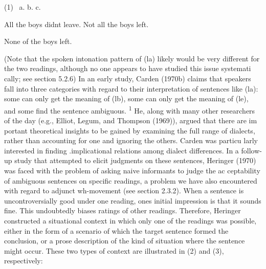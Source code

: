 \begin{multicols}{2}
\begin{styleStandard}
(1) \ a. b. c.
\end{styleStandard}


\begin{styleTextbody}
All the boys didn{\textquotesingle}t leave. Not all the boys left.
\end{styleTextbody}


\begin{styleTextbody}
None of the boys left.
\end{styleTextbody}


\end{multicols}
\begin{styleTextbody}
(Note that the spoken intonation pattern of (la) likely would be very different for the two readings, although no one appears to have studied this issue systemati\- cally; see section 5.2.6) In an early study, Carden (1970b) claims that speakers fall into three categories with regard to their interpretation of sentences like (la): some can only get the meaning of (lb), some can only get the meaning of (le), and some find the sentence ambiguous. \textsuperscript{1}\textsuperscript{ }He, along with many other researchers of the day (e.g., Elliot, Legum, and Thompson (1969)), argued that there are im\- portant theoretical insights to be gained by examining the full range of dialects, rather than accounting for one and ignoring the others. Carden was particu\- larly interested in finding .implicational relations among dialect differences. In a follow-up study that attempted to elicit judgments on these sentences, Heringer (1970) was faced with {\textquotedbl}the problem of asking naive informants to judge the ac\- ceptability of ambiguous sentences on specific readings,{\textquotedbl} a problem we have also encountered with regard to adjunct wh-movement (see section 2.3.2). When a sentence is uncontroversially good under one reading, one{\textquotesingle}s initial impression is that it sounds fine. This undoubtedly biases ratings of other readings. Therefore, Heringer constructed a situational context in which only one of the readings was possible, either in the form of a scenario of which the target sentence formed the conclusion, or a prose description of the kind of situation where the sentence might occur. These two types of context are illustrated in (2) and (3), respectively:
\end{styleTextbody}


